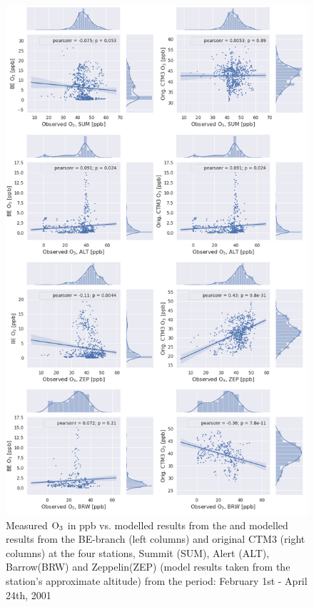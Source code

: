\begin{figure}[ht]
    \centering
    \includegraphics[width = 0.8\linewidth]{Chapter6_Results/images/Orig_BE_comp/jointplot_FebApr_O3_2001.png}
    \caption{Measured $\mathrm{O_3}$ in ppb vs. modelled results from the and modelled results from the BE-branch (left columns) and original CTM3 (right columns) at the four stations, Summit (SUM), Alert (ALT), Barrow(BRW) and Zeppelin(ZEP) (model results taken from the station's approximate altitude) from the period: February 1st - April 24th, 2001}
    \label{fig:joint_FebApr}
\end{figure}